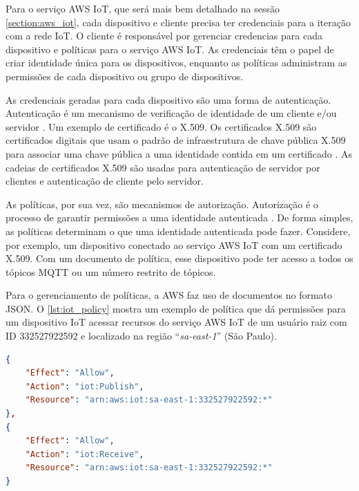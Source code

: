 Para o serviço AWS IoT, que será mais bem detalhado na sessão \autoref{section:aws_iot}, cada dispositivo e cliente precisa ter credenciais para a iteração com a rede IoT. O cliente é responsável por gerenciar credencias para cada dispositivo e políticas para o serviço AWS IoT. As credenciais têm o papel de criar identidade única para os dispositivos, enquanto as políticas administram as permissões de cada dispositivo ou grupo de dispositivos.

As credenciais geradas para cada dispositivo são uma forma de autenticação. Autenticação é um mecanismo de verificação de identidade de um cliente e/ou servidor \cite{ref:016}. Um exemplo de certificado é o X.509. Os certificados X.509 são certificados digitais que usam o padrão de infraestrutura de chave pública X.509 para associar uma chave pública a uma identidade contida em um certificado \cite{ref:015}. As cadeias de certificados X.509 são usadas para autenticação de servidor por clientes e autenticação de cliente pelo servidor.

As políticas, por sua vez, são mecanismos de autorização. Autorização é o processo de garantir permissões a uma identidade autenticada \cite{ref:017}. De forma simples, as políticas determinam o que uma identidade autenticada pode fazer. Considere, por exemplo, um dispositivo conectado ao serviço AWS IoT com um certificado X.509. Com um documento de política, esse dispositivo pode ter acesso a todos os tópicos MQTT ou um número restrito de tópicos.

Para o gerenciamento de políticas, a AWS faz uso de documentos no formato JSON. O \autoref{lst:iot_policy} mostra um exemplo de política que dá permissões para um dispositivo IoT acessar recursos do serviço AWS IoT de um usuário raiz com ID 332527922592 e localizado na região ``\textit{sa-east-1}'' (São Paulo).

\begin{lstlisting}[float=htbp,language=json,firstnumber=1,caption={Exemplo de uma política dando permissões de uso do serviço AWS IoT para um dispositivo IoT.},label=lst:iot_policy]
{
    "Effect": "Allow",
    "Action": "iot:Publish",
    "Resource": "arn:aws:iot:sa-east-1:332527922592:*"
},
{
    "Effect": "Allow",
    "Action": "iot:Receive",
    "Resource": "arn:aws:iot:sa-east-1:332527922592:*"
}
\end{lstlisting}

